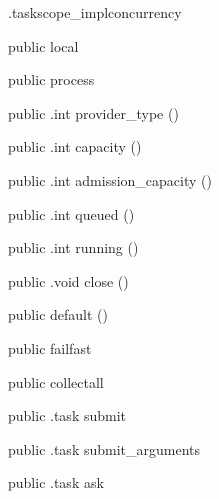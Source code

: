 \begin{CrexxClass}{.taskscope\_impl}{concurrency}

  \begin{Hierarchy}
  \end{Hierarchy}

  \begin{Members}

    \Factory
      {public}
      {local}
      {}

    \Factory
      {public}
      {process}
      {}

    \Method
      {public}
      {.int}
      {provider\_type}
      {()}

    \Method
      {public}
      {.int}
      {capacity}
      {()}

    \Method
      {public}
      {.int}
      {admission\_capacity}
      {()}

    \Method
      {public}
      {.int}
      {queued}
      {()}

    \Method
      {public}
      {.int}
      {running}
      {()}

    \Method
      {public}
      {.void}
      {close}
      {()}

    \Factory
      {public}
      {default}
      {()}

    \Factory
      {public}
      {failfast}
      {}

    \Factory
      {public}
      {collectall}
      {}

    \Method
      {public}
      {.task}
      {submit}
      {}

    \Method
      {public}
      {.task}
      {submit\_arguments}
      {}

    \Method
      {public}
      {.task}
      {ask}
      {}


\end{Members}
\end{CrexxClass}
